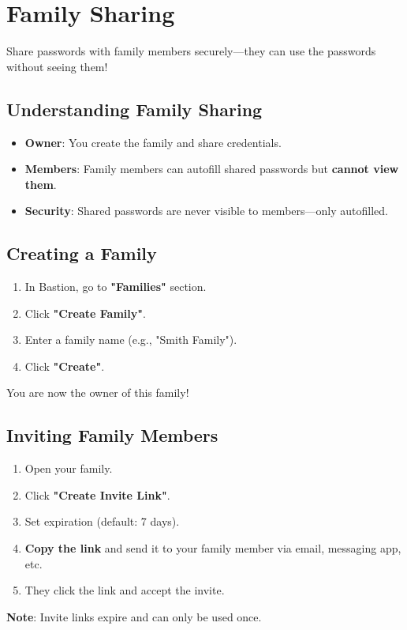 \documentclass[11pt,a4paper]{article}
\begin{document}
\section{Family Sharing}
Share passwords with family members securely—they can use the passwords without seeing them!

\subsection{Understanding Family Sharing}
\begin{itemize}
    \item \textbf{Owner}: You create the family and share credentials.
    \item \textbf{Members}: Family members can autofill shared passwords but \textbf{cannot view them}.
    \item \textbf{Security}: Shared passwords are never visible to members—only autofilled.
\end{itemize}

\subsection{Creating a Family}
\begin{enumerate}
    \item In Bastion, go to \textbf{"Families"} section.
    \item Click \textbf{"Create Family"}.
    \item Enter a family name (e.g., "Smith Family").
    \item Click \textbf{"Create"}.
\end{enumerate}
You are now the owner of this family!

\subsection{Inviting Family Members}
\begin{enumerate}
    \item Open your family.
    \item Click \textbf{"Create Invite Link"}.
    \item Set expiration (default: 7 days).
    \item \textbf{Copy the link} and send it to your family member via email, messaging app, etc.
    \item They click the link and accept the invite.
\end{enumerate}
\textbf{Note}: Invite links expire and can only be used once.
\end{document}
